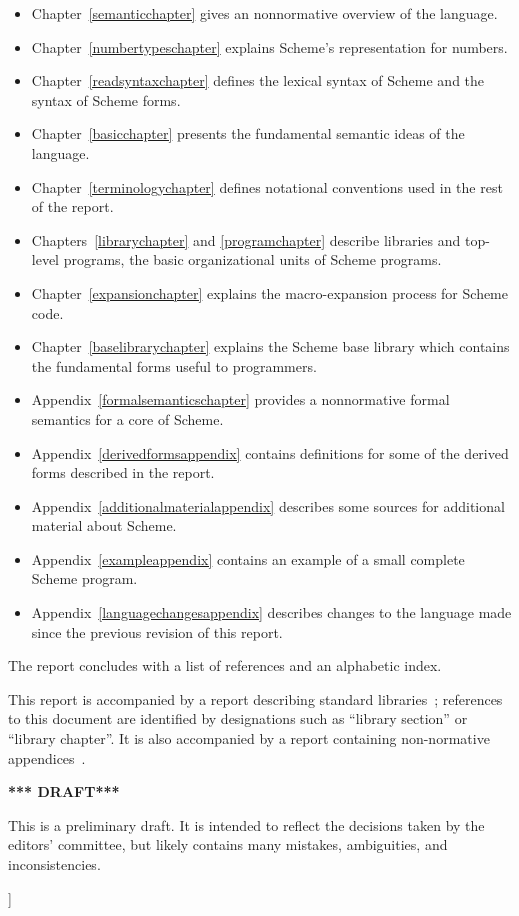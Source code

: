 \documentclass[twoside,twocolumn]{algol60}
\begin{document}
{\begin{itemize}
\item Chapter~\ref{semanticchapter} gives an nonnormative overview of the language.
\item Chapter~\ref{numbertypeschapter} explains Scheme's
  representation for numbers.
\item Chapter~\ref{readsyntaxchapter} defines the lexical syntax of
  Scheme and the syntax of Scheme forms.
\item Chapter~\ref{basicchapter} presents the fundamental semantic
  ideas of the language.
\item Chapter~\ref{terminologychapter} defines notational conventions
  used in the rest of the report.
\item Chapters~\ref{librarychapter} and \ref{programchapter} describe
  libraries and top-level programs, the basic organizational units of
  Scheme programs.
\item Chapter~\ref{expansionchapter} explains the macro-expansion process
  for Scheme code.
\item Chapter~\ref{baselibrarychapter} explains the Scheme base
  library which contains the fundamental forms useful to programmers.
\item Appendix~\ref{formalsemanticschapter} provides a nonnormative formal
  semantics for a core of Scheme.
\item Appendix~\ref{derivedformsappendix} contains definitions for
  some of the derived forms described in the report.
\item Appendix~\ref{additionalmaterialappendix} describes some sources
  for additional material about Scheme.
\item Appendix~\ref{exampleappendix} contains an example of a small
  complete Scheme program.
\item Appendix~\ref{languagechangesappendix} describes changes to the
  language made since the previous revision of this report.
\end{itemize}

The report concludes with a list of references and an
alphabetic index.

This report is accompanied by a report describing standard
libraries~\cite{R6RS-libraries}; references to this document are
identified by designations such as ``library section'' or ``library
chapter''.  It is also accompanied by a report containing
non-normative appendices~\cite{R6RS-appendices}.

\bigskip

\begin{center}
{\large \bf
*** DRAFT*** \\
}\end{center}

This is a preliminary draft.  It is intended to reflect the decisions
taken by the editors' committee, but likely contains many mistakes,
ambiguities, and inconsistencies.

}]
\end{document}
